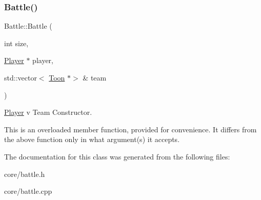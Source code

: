 \subsubsection{\texorpdfstring{Battle()}{Battle()}}
{\footnotesize\ttfamily Battle\+::\+Battle (\begin{DoxyParamCaption}\item[{int}]{size,  }\item[{\mbox{\hyperlink{classPlayer}{Player}} $\ast$}]{player,  }\item[{std\+::vector$<$ \mbox{\hyperlink{classToon}{Toon}} $\ast$$>$ \&}]{team }\end{DoxyParamCaption})}



\mbox{\hyperlink{classPlayer}{Player}} v Team Constructor. 

This is an overloaded member function, provided for convenience. It differs from the above function only in what argument(s) it accepts. 

The documentation for this class was generated from the following files\+:\begin{DoxyCompactItemize}
\item 
core/battle.\+h\item 
core/battle.\+cpp\end{DoxyCompactItemize}
